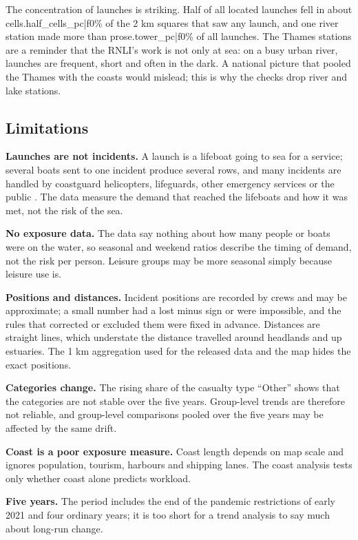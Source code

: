 \documentclass[11pt,a4paper]{article}
\begin{document}
The concentration of launches is striking. Half of all located launches fell in about {{cells.half_cells_pc|f0}}\% of the 2 km squares that saw any launch, and one river station made more than {{prose.tower_pc|f0}}\% of all launches. The Thames stations are a reminder that the RNLI's work is not only at sea: on a busy urban river, launches are frequent, short and often in the dark. A national picture that pooled the Thames with the coasts would mislead; this is why the checks drop river and lake stations.

\subsection{Limitations}
\textbf{Launches are not incidents.} A launch is a lifeboat going to sea for a service; several boats sent to one incident produce several rows, and many incidents are handled by coastguard helicopters, lifeguards, other emergency services or the public \citep{odi2021}. The data measure the demand that reached the lifeboats and how it was met, not the risk of the sea.

\textbf{No exposure data.} The data say nothing about how many people or boats were on the water, so seasonal and weekend ratios describe the timing of demand, not the risk per person. Leisure groups may be more seasonal simply because leisure use is.

\textbf{Positions and distances.} Incident positions are recorded by crews and may be approximate; a small number had a lost minus sign or were impossible, and the rules that corrected or excluded them were fixed in advance. Distances are straight lines, which understate the distance travelled around headlands and up estuaries. The 1 km aggregation used for the released data and the map hides the exact positions.

\textbf{Categories change.} The rising share of the casualty type ``Other'' shows that the categories are not stable over the five years. Group-level trends are therefore not reliable, and group-level comparisons pooled over the five years may be affected by the same drift.

\textbf{Coast is a poor exposure measure.} Coast length depends on map scale and ignores population, tourism, harbours and shipping lanes. The coast analysis tests only whether coast alone predicts workload.

\textbf{Five years.} The period includes the end of the pandemic restrictions of early 2021 and four ordinary years; it is too short for a trend analysis to say much about long-run change.
\end{document}
